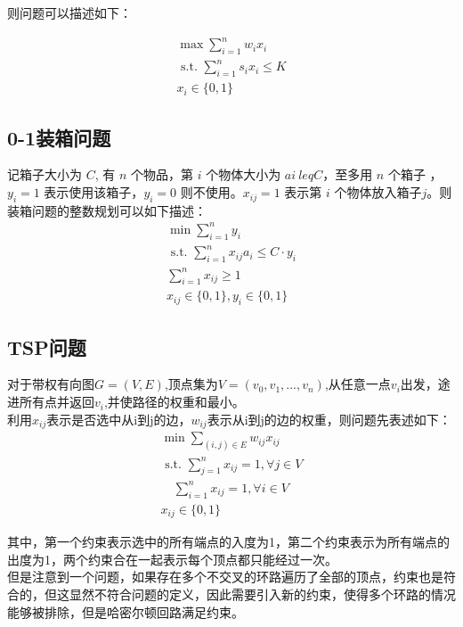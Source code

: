 \documentclass[11pt]{ctexart}
\begin{document}
则问题可以描述如下：

$$
\begin{array}{l}
\max \sum_{i=1}^{n} w_{i} x_{i} \\
\text { s.t. } \sum_{i=1}^{n} s_{i} x_{i} \leq K \\
x_{i} \in\{0,1\}
\end{array}
$$

\subsection{0-1装箱问题}

记箱子大小为 $C$, 有 $n$ 个物品，第 $i$ 个物体大小为 $ai\ leq C$，至多用 $n$ 个箱子 ， $y_i=1$ 表示使用该箱子，$y_i=0$ 则不使用。$x_{ij}=1$ 表示第 $i$ 个物体放入箱子$j$。则装箱问题的整数规划可以如下描述：
$$
\begin{array}{c}
\min \sum_{i=1}^{n} y_{i} \\
\text { s.t. } \sum_{i=1}^{n} x_{i j} a_{i} \leq C \cdot y_{i} \\
\sum_{i=1}^{n} x_{i j} \geq 1 \\
x_{i j} \in\{0,1\}, y_{i} \in\{0,1\}
\end{array}
$$

\subsection{TSP问题}

对于带权有向图$G=(V,E)$,顶点集为$V=(v_0,v_1,...,v_n)$,从任意一点$v_i$出发，途进所有点并返回$v_i$,并使路径的权重和最小。\\

利用$x_{ij}$表示是否选中从i到j的边，$w_{ij}$表示从i到j的边的权重，则问题先表述如下：
$$
\begin{array}{l}
\min \sum_{(i, j) \in E} w_{i j} x_{i j} \\
\text { s.t. } \sum_{j=1}^{n} x_{i j}=1, \forall j \in V \\
\quad \sum_{i=1}^{n} x_{i j}=1, \forall i \in V \\
x_{ij} \in \{0,1\}
\end{array}
$$

其中，第一个约束表示选中的所有端点的入度为1，第二个约束表示为所有端点的出度为1，两个约束合在一起表示每个顶点都只能经过一次。\\

但是注意到一个问题，如果存在多个不交叉的环路遍历了全部的顶点，约束也是符合的，但这显然不符合问题的定义，因此需要引入新的约束，使得多个环路的情况能够被排除，但是哈密尔顿回路满足约束。\\
\end{document}
